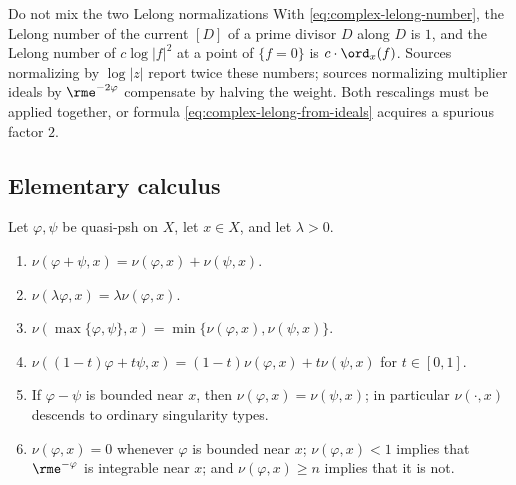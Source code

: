\begin{warning}{Do not mix the two Lelong normalizations}
\label{warn:ch51-lelong-normalization}
With \eqref{eq:complex-lelong-number}, the Lelong number of the current
\([D]\) of a prime divisor \(D\) along \(D\) is \(1\), and the Lelong
number of \(c\log|f|^2\) at a point of \(\{f=0\}\) is
\(c\cdot\ord_x(f)\).  Sources normalizing by \(\log|z|\) report twice
these numbers; sources normalizing multiplier ideals by
\(\rme^{-2\varphi}\) compensate by halving the weight.  Both rescalings
must be applied together, or formula
\eqref{eq:complex-lelong-from-ideals} acquires a spurious factor \(2\).
\end{warning}

\subsection{Elementary calculus}
\label{sec:ch51-lelong-calculus}

\begin{proposition}\label{prop:ch51-lelong-calculus}
Let \(\varphi,\psi\) be quasi-psh on \(X\), let \(x\in X\), and let
\(\lambda>0\).
\begin{enumerate}
\item\label{itm:ch51-lc:sum}
      \(\nu(\varphi+\psi,x)=\nu(\varphi,x)+\nu(\psi,x)\).
\item\label{itm:ch51-lc:scale}
      \(\nu(\lambda\varphi,x)=\lambda\nu(\varphi,x)\).
\item\label{itm:ch51-lc:max}
      \(\nu(\max\{\varphi,\psi\},x)=\min\{\nu(\varphi,x),\nu(\psi,x)\}\).
\item\label{itm:ch51-lc:convex}
      \(\nu((1-t)\varphi+t\psi,x)=(1-t)\nu(\varphi,x)+t\nu(\psi,x)\) for
      \(t\in[0,1]\).
\item\label{itm:ch51-lc:bounded}
      If \(\varphi-\psi\) is bounded near \(x\), then
      \(\nu(\varphi,x)=\nu(\psi,x)\); in particular \(\nu(\cdot,x)\)
      descends to ordinary singularity types.
\item\label{itm:ch51-lc:smooth}
      \(\nu(\varphi,x)=0\) whenever \(\varphi\) is bounded near \(x\);
      \(\nu(\varphi,x)<1\) implies that \(\rme^{-\varphi}\) is integrable
      near \(x\); and \(\nu(\varphi,x)\geq n\) implies that it is not.
\end{enumerate}
\end{proposition}

